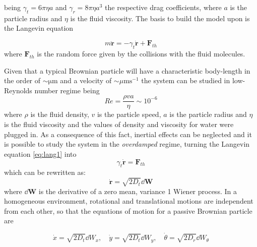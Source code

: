 \documentclass[../../master_thesis_np.tex]{subfiles}
\begin{document}
	being $\gamma_t = 6 \pi \eta a$ and $\gamma_r = 8 \pi \eta a^3$  the respective drag coefficients, where $a$ is the particle radius and $\eta$ is the fluid viscosity. The basis to build the model upon is the Langevin equation
	
	\begin{equation} \label{eq:lang1}
		m \mathbf{\ddot{r}} = -\gamma_t \mathbf{\dot{r}} + \mathbf{F}_{th}
	\end{equation} 
	where $\mathbf{F}_{th}$ is the random force given by the collisions with the fluid molecules.
	
	Given that a typical Brownian particle will have a characteristic body-length in the order of $ \mathrm{\sim\mu m}$ and a velocity of $\sim\mu \mathrm{m s}^{-1}$ the system can be studied in low-Reynolds number regime being 
	\begin{equation}
	Re = \frac{\rho v a}{\eta} \sim 10^{-6} 
	\end{equation}  
	where $\rho$ is the fluid density, $v$ is the particle speed, $a$ is the particle radius and $\eta$ is the fluid viscosity and the values of density and viscosity for water were plugged in. As a consequence of this fact, inertial effects can be neglected and it is possible to study the system in the \emph{overdamped} regime, turning the Langevin equation \ref{eq:lang1} into
	\begin{equation} \label{eq:lang2}
		\gamma_t \mathbf{\dot{r}} = \mathbf{F}_{th}
	\end{equation}
	which can be rewritten as:
	\begin{equation}
		\mathbf{\dot{r}} = \sqrt{2D_t} \dd{\mathbf{W}}
	\end{equation}
	where $\dd{\mathbf{W}}$ is the derivative of a zero mean, variance 1 Wiener process.
	In a homogeneous environment, rotational and translational motions are independent from each other, so that the equations of motion for a passive Brownian particle are
	
	\begin{equation}
		\dot{x} = \sqrt{2D_t}\dd{W_x}, \quad \dot{y} = \sqrt{2D_t}\dd{W_y}, \quad \dot{\theta} = \sqrt{2D_r}\dd{W_{\theta}}
	\end{equation}
	
	
\end{document}
